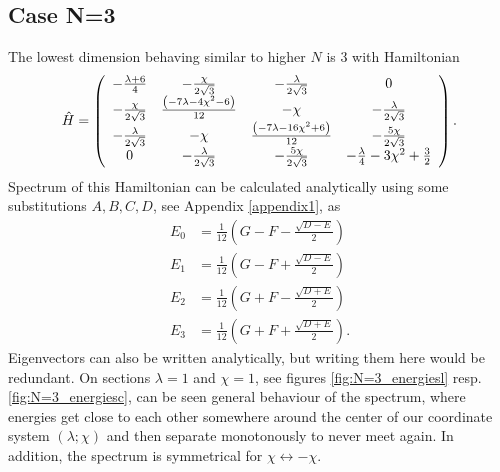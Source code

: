 \subsection{Case N=3}
The lowest dimension behaving similar to higher $N$ is 3 with Hamiltonian
\begin{equation}
    \hat{H}=\left(
        \begin{array}{cccc}
         -\frac{ \lambda +6}{4} & -\frac{\chi }{2 \sqrt{3}} & -\frac{\lambda }{2 \sqrt{3}} & 0 \\
         -\frac{\chi }{2 \sqrt{3}} & \frac{ \left(-7 \lambda -4 \chi ^2-6\right)}{12} & -\chi  & -\frac{\lambda }{2 \sqrt{3}} \\
         -\frac{\lambda }{2 \sqrt{3}} & -\chi  & \frac{ \left(-7 \lambda -16 \chi ^2+6\right)}{12} & -\frac{5 \chi }{2 \sqrt{3}} \\
         0 & -\frac{\lambda }{2 \sqrt{3}} & -\frac{5 \chi }{2 \sqrt{3}} & -\frac{\lambda }{4}-3 \chi ^2+\frac{3}{2} \\
        \end{array}
        \right).
\end{equation}
Spectrum of this Hamiltonian can be calculated analytically using some substitutions $A,B,C,D$, see Appendix \ref{appendix1}, as
\begin{align}
        E_0 &= \frac{1}{12} \left(G-F-\frac{\sqrt{D-E}}{2}\right)
        \label{eq:N=3_en0}\\
        E_1 &= \frac{1}{12}  \left(G-F+\frac{\sqrt{D-E}}{2}\right)
        \label{eq:N=3_en1}\\
        E_2 &= \frac{1}{12} \left(G+F-\frac{\sqrt{D+E}}{2}\right)
        \label{eq:N=3_en2}\\
        E_3 &= \frac{1}{12}  \left(G+F+\frac{\sqrt{D+E}}{2}\right).
        \label{eq:N=3_en3}
\end{align}
Eigenvectors can also be written analytically, but writing them here would be redundant. On sections $\lambda=1$ and $\chi=1$, see figures \ref{fig:N=3_energiesl} resp. \ref{fig:N=3_energiesc}, can be seen general behaviour of the spectrum, where energies get close to each other somewhere around the center of our coordinate system $(\lambda;\chi)$ and then separate monotonously to never meet again. In addition, the spectrum is symmetrical for $\chi\leftrightarrow -\chi$.
